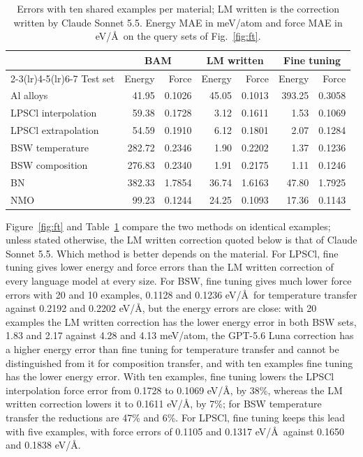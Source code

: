 \begin{table}[t]
\caption{Errors with ten shared examples per material; LM written is the correction written by Claude Sonnet 5.5. Energy MAE in meV/atom and force MAE in eV/\AA\ on the query sets of Fig.~\ref{fig:ft}.}
\label{tab:ft}
\footnotesize
\setlength{\tabcolsep}{4pt}
\begin{tabular}{lrrrrrr}
\toprule
 & \multicolumn{2}{c}{BAM} & \multicolumn{2}{c}{LM written} & \multicolumn{2}{c}{Fine tuning} \\
\cmidrule(lr){2-3}\cmidrule(lr){4-5}\cmidrule(lr){6-7}
Test set & Energy & Force & Energy & Force & Energy & Force \\
\midrule
Al alloys & 41.95 & 0.1026 & 45.05 & 0.1013 & 393.25 & 0.3058 \\
LPSCl interpolation & 59.38 & 0.1728 & 3.12 & 0.1611 & 1.53 & 0.1069 \\
LPSCl extrapolation & 54.59 & 0.1910 & 6.12 & 0.1801 & 2.07 & 0.1284 \\
BSW temperature & 282.72 & 0.2346 & 1.90 & 0.2202 & 1.37 & 0.1236 \\
BSW composition & 276.83 & 0.2340 & 1.91 & 0.2175 & 1.11 & 0.1246 \\
BN & 382.33 & 1.7854 & 36.74 & 1.6163 & 47.80 & 1.7925 \\
NMO & 99.23 & 0.1244 & 24.25 & 0.1093 & 17.36 & 0.1143 \\
\bottomrule
\end{tabular}
\end{table}

Figure~\ref{fig:ft} and Table~\ref{tab:ft} compare the two methods on identical examples; unless stated otherwise, the LM written correction quoted below is that of Claude Sonnet 5.5. Which method is better depends on the material. For LPSCl, fine tuning gives lower energy and force errors than the LM written correction of every language model at every size. For BSW, fine tuning gives much lower force errors with 20 and 10 examples, 0.1128 and 0.1236 eV/\AA\ for temperature transfer against 0.2192 and 0.2202 eV/\AA, but the energy errors are close: with 20 examples the LM written correction has the lower energy error in both BSW sets, 1.83 and 2.17 against 4.28 and 4.13 meV/atom, the GPT-5.6 Luna correction has a higher energy error than fine tuning for temperature transfer and cannot be distinguished from it for composition transfer, and with ten examples fine tuning has the lower energy error. With ten examples, fine tuning lowers the LPSCl interpolation force error from 0.1728 to 0.1069 eV/\AA, by 38\%, whereas the LM written correction lowers it to 0.1611 eV/\AA, by 7\%; for BSW temperature transfer the reductions are 47\% and 6\%. For LPSCl, fine tuning keeps this lead with five examples, with force errors of 0.1105 and 0.1317 eV/\AA\ against 0.1650 and 0.1838 eV/\AA.

